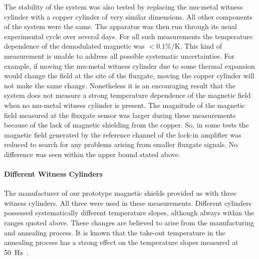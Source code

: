 


The stability of the system was also tested by replacing the mu-metal
witness cylinder with a copper cylinder of very similar dimensions.
All other components of the system were the same.  The apparatus was
then run through its usual experimental cycle over several days.  For
all such measurements the temperature dependence of the demodulated
magnetic was $<0.1$\%/K.  This kind of measurement is unable to
address all possible systematic uncertainties.  For example, if moving
the mu-metal witness cylinder due to some thermal expansion would
change the field at the site of the fluxgate, moving the copper
cylinder will not make the same change.  Nonetheless it is an
encouraging result that the system does not measure a strong
temperature dependence of the magnetic field when no mu-metal witness
cylinder is present.  The magnitude of the magnetic field measured at
the fluxgate sensor was larger during these measurements because of
the lack of magnetic shielding from the copper.  So, in some tests the
magnetic field generated by the reference channel of the lock-in
amplifier was reduced to search for any problems arising from smaller
fluxgate signals.  No difference was seen within the upper bound
stated above.

\paragraph{Different Witness Cylinders}

The manufacturer of our prototype magnetic shields provided us with
three witness cylinders.  All three were used in these measurements.
Different cylinders possessed systematically different temperature
slopes, although always within the ranges quoted above.  These changes
are believed to arise from the manufacturing and annealing process.
It is known that the take-out temperature in the annealing process has
a strong effect on the temperature slopes measured at
50~Hz~\cite{bib:kruppdatasheet}.



